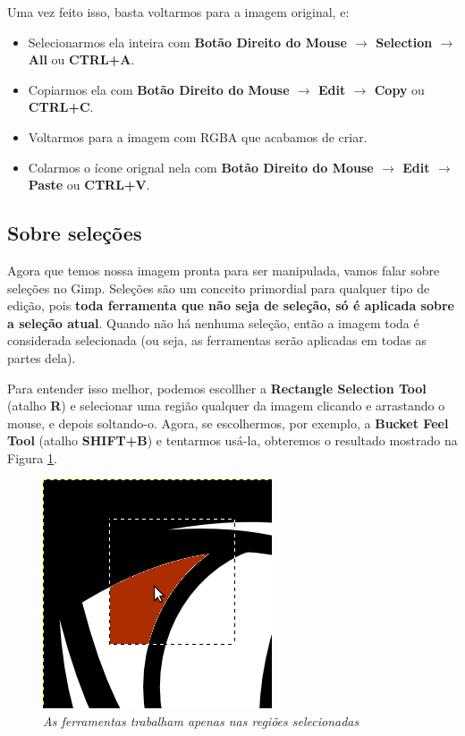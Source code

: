 \documentclass[12pt,onecolumn]{article}
\begin{document}
    Uma vez feito isso, basta voltarmos para a imagem original, e:
    
    \begin{itemize}
      \item
        Selecionarmos ela inteira com {\bf Botão Direito do Mouse $\rightarrow$
        Selection $\rightarrow$ All} ou {\bf CTRL+A}.
      \item
        Copiarmos ela com {\bf Botão Direito do Mouse $\rightarrow$ Edit
        $\rightarrow$ Copy} ou {\bf CTRL+C}.
      \item
        Voltarmos para a imagem com RGBA que acabamos de criar.
      \item
        Colarmos o ícone orignal nela com {\bf Botão Direito do Mouse
        $\rightarrow$ Edit $\rightarrow$ Paste} ou {\bf CTRL+V}.
    \end{itemize}
    
    
  \subsection{Sobre seleções}
    Agora que temos nossa imagem pronta para ser manipulada, vamos falar sobre
    seleções no Gimp. Seleções são um conceito primordial para qualquer tipo de
    edição, pois {\bf toda ferramenta que não seja de seleção, só é aplicada
    sobre a seleção atual}. Quando não há nenhuma seleção, então a imagem toda
    é considerada selecionada (ou seja, as ferramentas serão aplicadas em todas
    as partes dela).
    
    Para entender isso melhor, podemos escollher a {\bf Rectangle Selection
    Tool} (atalho {\bf R}) e selecionar uma região qualquer da imagem
    clicando e arrastando o mouse, e depois soltando-o. Agora, se escolhermos,
    por exemplo, a {\bf Bucket Feel Tool} (atalho {\bf SHIFT+B}) e tentarmos
    usá-la, obteremos o resultado mostrado na Figura
    \ref{fig:selective_painting}.
  
    \begin{figure}[H]
      \centering
      \includegraphics[scale=0.6]{screenshots/01-selective_painting.png}
      \caption{
        \footnotesize
        \it
        As ferramentas trabalham apenas nas regiões selecionadas
      }
      \label{fig:selective_painting}
    \end{figure}
    
\end{document}
